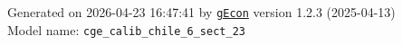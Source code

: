 \documentclass[10pt,a4paper]{article}
\numberwithin{equation}{section}
\begin{document}
\begin{landscape}
\begin{flushleft}{\large
Generated  on 2026-04-23 16:47:41 by \href{http://gecon.r-forge.r-project.org/}{\texttt{gEcon}} version 1.2.3 (2025-04-13)\\
Model name: \verb+cge_calib_chile_6_sect_23+
}\end{flushleft}


\end{landscape}

\end{document}

